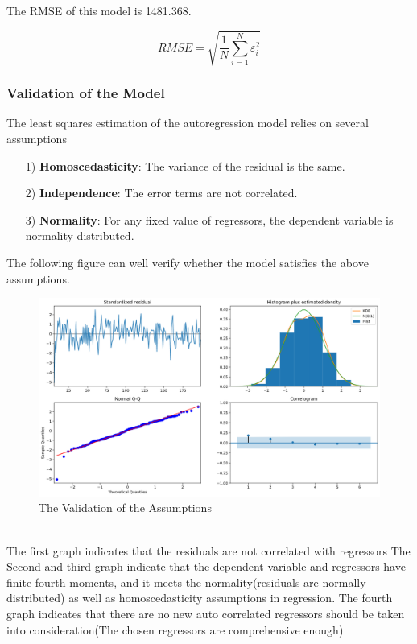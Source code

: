 \documentclass{article}
\begin{document}
The RMSE of this model is 1481.368.

\begin{equation}
	RMSE = \sqrt{\frac{1}{N}\sum_{i=1}^{N}\varepsilon_{i}^{2}}
\end{equation}

\subsubsection{Validation of the Model}
The least squares estimation of the autoregression model relies on several assumptions
\begin{itemize}
	\item [1)] \textbf{Homoscedasticity}: The variance of the residual is the same.
	\item [2)] \textbf{Independence}: The error terms are not correlated.
	\item [3)] \textbf{Normality}: For any fixed value of regressors, the dependent variable is normality distributed.
\end{itemize}
The following figure can well verify whether the model satisfies the above assumptions.\\
\begin{figure}[htbp]\centering
	\includegraphics[width=15cm]{Autoreg_Assump.png}
	\caption{The Validation of the Assumptions}
	\label{fig: Auto regression}
\end{figure}
\\The first graph indicates that the residuals are not correlated with regressors The Second and third graph indicate that the dependent variable and regressors have finite fourth moments, and it meets the normality(residuals are normally distributed) as well as homoscedasticity assumptions in regression. The fourth graph indicates that there are no new auto correlated regressors should be taken into consideration(The chosen regressors are comprehensive enough)
\end{document}
